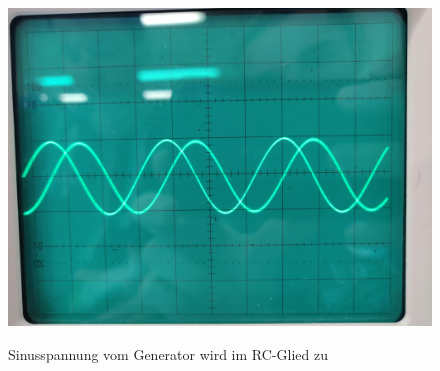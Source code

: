 \begin{figure}
    \centering
    \includegraphics[width=\textwidth]{content/data/sinus.jpg}
    \label{fig:sinus}
    \caption{Sinusspannung vom Generator wird im RC-Glied zu}
\end{figure}

